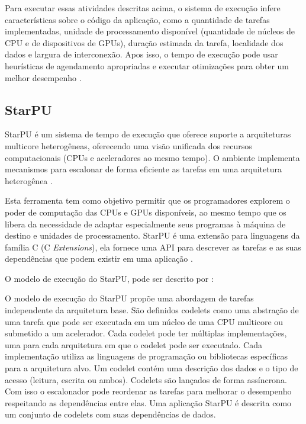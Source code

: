 Para executar essas atividades descritas acima, o sistema de execução infere características sobre o código da aplicação, como a quantidade de tarefas implementadas, unidade de processamento disponível (quantidade de núcleos de CPU e de dispositivos de GPUs), duração estimada da tarefa, localidade dos dados e largura de interconexão.
Apos isso, o tempo de execução pode usar heurísticas de agendamento apropriadas e executar otimizações para obter um melhor desempenho \cite{pinto2017visual}.

\subsection{StarPU}
StarPU é um sistema de tempo de execução que oferece suporte a arquiteturas multicore heterogêneas, oferecendo uma visão unificada dos recursos computacionais (CPUs e aceleradores ao mesmo tempo).
O ambiente implementa mecanismos para escalonar de forma eficiente as tarefas em uma arquitetura heterogênea \cite{augonnet2011scheduling}. 

Esta ferramenta tem como objetivo permitir que os programadores explorem o poder de computação das CPUs e GPUs disponíveis, ao mesmo tempo que os libera da necessidade de adaptar especialmente seus programas à máquina de destino e unidades de processamento.
StarPU é uma extensão para linguagens da família C (C \textit{Extensions}), ela fornece uma API para descrever as tarefas e as suas dependências que podem existir em uma aplicação \cite{augonnet2011scheduling}.

\newpage

O modelo de execução do StarPU, pode ser descrito por :

\begin{citacao}
O modelo de execução do StarPU propõe uma abordagem de tarefas independente da arquitetura base.
São definidos codelets como uma abstração de uma tarefa que pode ser executada em um núcleo de uma CPU multicore ou submetido a um acelerador.
Cada codelet pode ter múltiplas implementações, uma para cada arquitetura em que o codelet pode ser executado.
Cada implementação utiliza as linguagens de programação ou bibliotecas específicas para a arquitetura alvo.
Um codelet contém uma descrição dos dados e o tipo de acesso (leitura, escrita ou ambos).
Codelets são lançados de forma assíncrona. Com isso o escalonador pode reordenar as tarefas para melhorar o desempenho respeitando as dependências entre elas.
Uma aplicação StarPU é descrita como um conjunto de codelets com suas dependências de dados. \cite[p.~26]{pinto2011ambientes}
\end{citacao}

